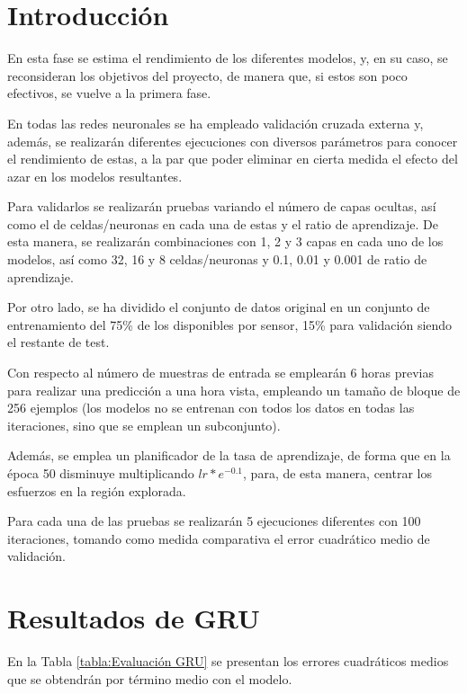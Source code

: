 
\section{Introducción}
En esta fase se estima el rendimiento de los diferentes modelos, y, en su caso, 
se reconsideran los objetivos del proyecto, de manera que, si estos son poco efectivos,
se vuelve a la primera fase.

En todas las redes neuronales se ha empleado validación cruzada externa y, además, se realizarán
diferentes ejecuciones con diversos parámetros para conocer el rendimiento de estas, a 
la par que poder eliminar en cierta medida el efecto del azar en los modelos 
resultantes.

Para validarlos se realizarán pruebas variando el número de capas
ocultas, así como el de celdas/neuronas en cada una de estas y el ratio de aprendizaje.
De esta manera, se realizarán combinaciones con 1, 2 y 3 capas en cada uno de los modelos, 
así como 32, 16 y 8 celdas/neuronas y 0.1, 0.01 y 0.001 de ratio de aprendizaje. 

Por otro lado, se ha dividido el conjunto de datos original en un conjunto de entrenamiento del 75\% de los disponibles
por sensor, 15\% para validación siendo el restante de test.

Con respecto al número de muestras de entrada se emplearán 6 horas previas para realizar
una predicción a una hora vista, empleando un tamaño de bloque de 256 ejemplos (los modelos 
no se entrenan con todos los datos en todas las iteraciones, sino que se emplean un subconjunto).

Además, se emplea un planificador de la tasa de aprendizaje, de forma
que en la época 50 disminuye multiplicando \(lr * e^{-0.1}\), para, de esta manera,
centrar los esfuerzos en la región explorada.

Para cada una de las pruebas se realizarán 5 ejecuciones diferentes con 100 iteraciones, 
tomando como medida comparativa el error cuadrático medio de validación.

\section{Resultados de GRU}
En la Tabla \ref{tabla:Evaluación GRU} se presentan los errores cuadráticos medios
que se obtendrán por término medio con el modelo. 

